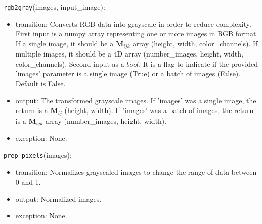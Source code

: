 \documentclass[12pt, titlepage]{article}
\def\code#1{\texttt{#1}}
\begin{document}
\noindent \code{rgb2gray}(images, input\_image):
\begin{itemize}
  \item transition: Converts RGB data into grayscale in order to reduce complexity. 
  First input is a numpy array representing one or more images in RGB format. 
  If a single image, it should be a $\mathbf{M}_{ijk}$ array 
  (height, width, color\_channels). If multiple images, it should be a 4D array 
  (number\_images, height, width, color\_channels).
  Second input as a $bool$. It is a flag to indicate if the provided 'images' 
  parameter is a single image (True) or a batch of images (False). Default is False.
  \item output: The transformed grayscale images. If 'images' was a 
  single image, the return is a $\mathbf{M}_{ij}$ (height, width).
  If 'images' was a batch of images, the return is a $\mathbf{M}_{ijk}$ 
  array (number\_images, height, width).
  \item exception: None.
\end{itemize}

\noindent \code{prep\_pixels}(images):
\begin{itemize}
  \item transition: Normalizes grayscaled images to change the range of data between 0 and 1.
  \item output: Normalized images.
  \item exception: None.
\end{itemize}
\end{document}
